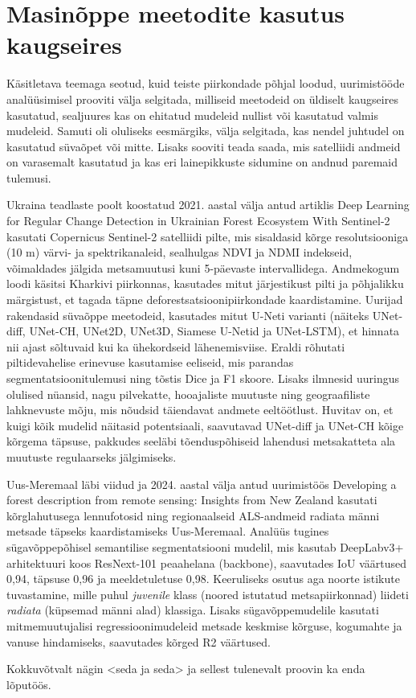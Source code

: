 \section{Masinõppe meetodite kasutus kaugseires}
Käsitletava teemaga seotud, kuid teiste piirkondade põhjal loodud, uurimistööde analüüsimisel prooviti välja selgitada, milliseid meetodeid on üldiselt kaugseires kasutatud, sealjuures kas on ehitatud mudeleid nullist või kasutatud
valmis mudeleid. Samuti oli oluliseks eesmärgiks, välja selgitada, kas nendel juhtudel on kasutatud süvaõpet või mitte. Lisaks sooviti teada saada, mis satelliidi andmeid on varasemalt kasutatud ja kas eri lainepikkuste sidumine on andnud paremaid tulemusi.

Ukraina teadlaste poolt koostatud 2021. aastal välja antud artiklis \glqq Deep Learning for Regular Change
Detection in Ukrainian Forest Ecosystem With Sentinel-2\grqq{} kasutati Copernicus Sentinel-2 satelliidi pilte, mis sisaldasid kõrge resolutsiooniga (10 m) värvi- ja spektrikanaleid, sealhulgas NDVI ja NDMI indekseid, võimaldades jälgida metsamuutusi kuni 5-päevaste intervallidega. Andmekogum loodi käsitsi Kharkivi piirkonnas, kasutades mitut järjestikust pilti ja põhjalikku märgistust, et tagada täpne deforestsatsioonipiirkondade kaardistamine. Uurijad rakendasid süvaõppe meetodeid, kasutades mitut U-Neti varianti (näiteks UNet-diff, UNet-CH, UNet2D, UNet3D, Siamese U-Netid ja UNet-LSTM), et hinnata nii ajast sõltuvaid kui ka ühekordseid lähenemisviise. Eraldi rõhutati piltidevahelise erinevuse kasutamise eeliseid, mis parandas segmentatsioonitulemusi ning tõstis Dice ja F1 skoore. Lisaks ilmnesid uuringus olulised nüansid, nagu pilvekatte, hooajaliste muutuste ning geograafiliste lahknevuste mõju, mis nõudsid täiendavat andmete eeltöötlust. Huvitav on, et kuigi kõik mudelid näitasid potentsiaali, saavutavad UNet-diff ja UNet-CH kõige kõrgema täpsuse, pakkudes seeläbi tõenduspõhiseid lahendusi metsakatteta ala muutuste regulaarseks jälgimiseks. \cite{isaienkovDeepLearningRegular2021}

Uus-Meremaal läbi viidud ja 2024. aastal välja antud uurimistöös \glqq Developing a forest description from remote sensing: Insights from
New Zealand\grqq{} kasutati kõrglahutusega lennufotosid ning regionaalseid ALS-andmeid radiata männi metsade täpseks kaardistamiseks Uus-Meremaal. Analüüs tugines sügavõppepõhisel semantilise segmentatsiooni mudelil, mis kasutab DeepLabv3+ arhitektuuri koos ResNext-101 peaahelana (backbone), saavutades IoU väärtused 0,94, täpsuse 0,96 ja meeldetuletuse 0,98. Keeruliseks osutus aga noorte istikute tuvastamine, mille puhul \textit{juvenile} klass (noored istutatud metsapiirkonnad) liideti \textit{radiata} (küpsemad männi alad) klassiga. Lisaks sügavõppemudelile kasutati mitmemuutujalisi regressioonimudeleid metsade keskmise kõrguse, kogumahte ja vanuse hindamiseks, saavutades kõrged R2 väärtused. \cite{pearseDevelopingForestDescription2025}

Kokkuvõtvalt nägin <seda ja seda> ja sellest tulenevalt proovin ka enda lõputöös. 
